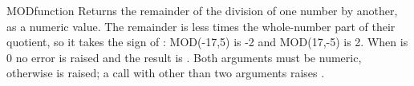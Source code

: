 \begin{XbaseEntry}{MOD}{function}
Returns the remainder of the division of one number by another, as a numeric value.
\Syntax
{}
\Usage
The remainder is  less  times the whole-number part of their quotient, so it takes the sign of : MOD(-17,5) is -2 and MOD(17,-5) is 2. When  is 0 no error is raised and the result is . Both arguments must be numeric, otherwise  is raised; a call with other than two arguments raises .
\Examples
{}
\end{XbaseEntry}


